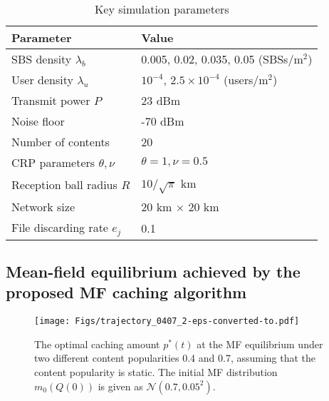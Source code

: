 \documentclass{book}
\begin{document}
            
            \begin{table} [h]
            \centering \caption{Key simulation parameters}\small
            \small\begin{tabular}{|l||l|}
              \hline
              \footnotesize Parameter & \footnotesize Value  \\
              \hline
            \footnotesize SBS density $\lambda_b$& \footnotesize 0.005, 0.02, 0.035, 0.05 (SBSs/m$^2$)
             \\
            \footnotesize  User density $\lambda_u$  &\footnotesize $10^{-4}$, $2.5 \times 10^{-4}$ (users/m$^2$)
               \\
            \footnotesize   Transmit power $P$ &\footnotesize 23 dBm
             \\
             \footnotesize  Noise floor &\footnotesize -70 dBm
             \\
            \footnotesize   Number of contents    &\footnotesize 20
             \\
               CRP parameters  $\theta, \nu$  &\footnotesize $\theta=1,\nu=0.5$
               \\
            \footnotesize  Reception ball radius $R$ &\footnotesize $10/\sqrt{\pi} $ km
             \\
            \footnotesize  Network size &\footnotesize 20  km $\times$ 20 km
             \\
            \footnotesize   File discarding rate $e_j$&\footnotesize 0.1
             \\
              \hline
            \end{tabular}\label{table}
            \end{table}
            
            \subsection {Mean-field equilibrium achieved by the proposed MF caching algorithm}
            
            
            
            
            
            
            
            
            
            
            
            \begin{figure} 
            \centering
            \texttt{[image: Figs/trajectory\_0407\_2-eps-converted-to.pdf]}   %
            \caption{\small{The optimal caching amount  $p^*(t)$ at the MF equilibrium under two different content popularities 0.4 and 0.7, assuming that the content popularity is static. The initial MF distribution $m_0(Q(0))$ is given as $\mathcal{N}(0.7,0.05^2)$.   }  }\label{trajectory_control}
            \end{figure}
            
\end{document}
